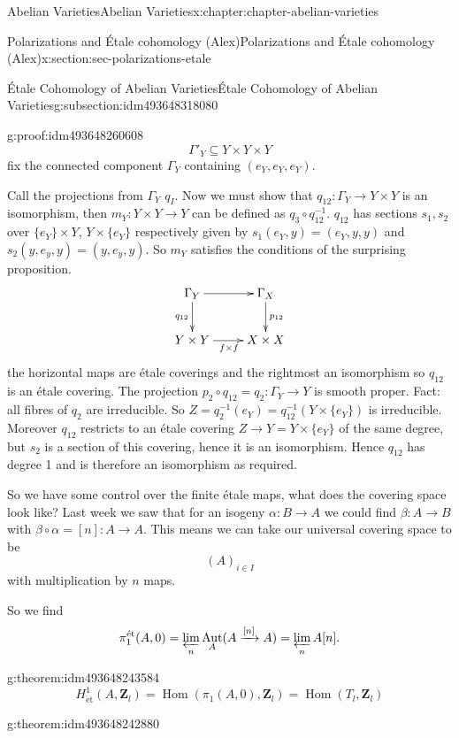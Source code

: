 \documentclass[oneside,10pt,]{book}
\numberwithin{equation}{section}
\newcommand{\lb}{[}
\newcommand{\rb}{]}
\newcommand{\ZZ}{\mathbf{Z}}
\newcommand{\et}{\mathrm{\acute{e}t}}
\DeclareMathOperator{\Hom}{Hom}
\DeclareMathOperator{\Aut}{Aut}
\begin{document}
\begin{chapterptx}{Abelian Varieties}{}{Abelian Varieties}{}{}{x:chapter:chapter-abelian-varieties}
\begin{sectionptx}{Polarizations and Étale cohomology (Alex)}{}{Polarizations and Étale cohomology (Alex)}{}{}{x:section:sec-polarizations-etale}
\begin{subsectionptx}{Étale Cohomology of Abelian Varieties}{}{Étale Cohomology of Abelian Varieties}{}{}{g:subsection:idm493648318080}
\begin{proofptx}{}{g:proof:idm493648260608}
\begin{equation*}
\Gamma'_Y \subseteq Y\times Y\times Y
\end{equation*}
fix the connected component \(\Gamma_Y\) containing \((e_Y,e_Y,e_Y)\).%
\par
Call the projections from \(\Gamma_Y\) \(q_I\). Now we must show that \(q_{12}\colon \Gamma_Y \to Y\times Y\) is an isomorphism, then \(m_Y\colon Y\times Y \to Y\) can be defined as \(q_3 \circ q_{12}^{-1}\). \(q_{12}\) has sections \(s_1,s_2\) over \(\{e_Y\}\times Y\), \(Y\times \{e_Y\}\) respectively given by \(s_1(e_Y,y) = (e_Y,y,y)\) and \(s_2(y,e_y,y) = (y,e_y,y)\). So \(m_Y\) satisfies the conditions of the surprising proposition.%
\begin{equation*}
\xymatrix{
\Gamma_Y \ar[r]\ar[d]_{q_{12}} & \Gamma_X\ar[d]^{p_{12}} \\
Y\times Y \ar[r]_{f\times f} & X\times X
}
\end{equation*}
the horizontal maps are étale coverings and the rightmost an isomorphism so \(q_{12}\) is an étale covering. The projection \(p_2 \circ q_{12} = q_2 \colon \Gamma_Y\to Y\) is smooth proper. Fact: all fibres of \(q_2\) are irreducible. So \(Z = q_2^{-1} (e_Y) = q_{12}^{-1}(Y\times \{e_Y\})\) is irreducible. Moreover \(q_{12}\) restricts to an étale covering \(Z \to Y = Y\times\{e_Y\}\) of  the same degree, but \(s_2\) is a section of this covering, hence it is an isomorphism. Hence \(q_{12}\) has degree 1 and is therefore an isomorphism as required.%
\end{proofptx}
So we have some control over the finite étale maps, what does the covering space look like? Last week we saw that for an isogeny \(\alpha\colon B \to A\) we could find \(\beta \colon A \to B\) with \(\beta\circ\alpha = \lb n\rb\colon A \to A\). This means we can take our universal covering space to be%
\begin{equation*}
(A)_{i\in I}
\end{equation*}
with multiplication by \(n\) maps.%
\par
So we find%
\begin{equation*}
\pi_1^\et(A,0) =\varprojlim_n \Aut_A(A\xrightarrow{[n]} A)=  \varprojlim_n A[n]\text{.}
\end{equation*}
%
\begin{theorem}{}{}{g:theorem:idm493648243584}%
%
\begin{equation*}
H^1_\et(A , \ZZ_l) = \Hom(\pi_1(A,0), \ZZ_l) = \Hom(T_l,\ZZ_l)
\end{equation*}
%
\end{theorem}
\begin{theorem}{}{}{g:theorem:idm493648242880}%

\end{theorem}
\end{subsectionptx}
\end{sectionptx}
\end{chapterptx}
\end{document}

